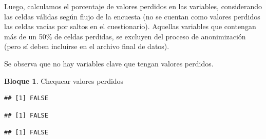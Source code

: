 \documentclass[]{book}
\newenvironment{Shaded}{\begin{snugshade}}{\end{snugshade}}
\newcommand{\KeywordTok}[1]{\textcolor[rgb]{0.13,0.29,0.53}{\textbf{#1}}}
\newcommand{\NormalTok}[1]{#1}
\newcommand{\OperatorTok}[1]{\textcolor[rgb]{0.81,0.36,0.00}{\textbf{#1}}}
\theoremstyle{definition}
\theoremstyle{definition}
\newtheorem{example}{Bloque}[chapter]
\theoremstyle{definition}
\theoremstyle{definition}
\theoremstyle{remark}
\begin{document}
Luego, calculamos el porcentaje de valores perdidos en las variables, considerando las celdas válidas según flujo de la encuesta (no se cuentan como valores perdidos las celdas vacías por saltos en el cuestionario). Aquellas variables que contengan más de un 50\% de celdas perdidas, se excluyen del proceso de anonimización (pero sí deben incluirse en el archivo final de datos).

Se observa que no hay variables clave que tengan valores perdidos.

\begin{example}
\protect\hypertarget{exm:bloque35nbm}{}{\label{exm:bloque35nbm} }Chequear valores perdidos
\end{example}

\begin{Shaded}
\end{Shaded}

\begin{verbatim}
## [1] FALSE
\end{verbatim}

\begin{Shaded}
\end{Shaded}

\begin{verbatim}
## [1] FALSE
\end{verbatim}

\begin{Shaded}
\end{Shaded}

\begin{verbatim}
## [1] FALSE
\end{verbatim}

\begin{Shaded}
\end{Shaded}
\end{document}
